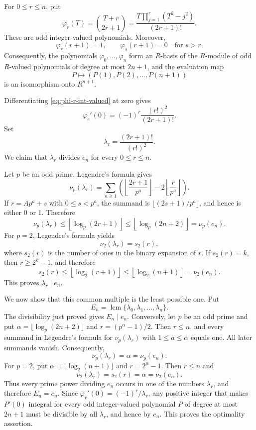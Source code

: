 \documentclass[14pt,dvipsnames]{extarticle}
\makeatletter
\numberwithin{equation}{subsection}
\theoremstyle{plain}
\theoremstyle{definition}
\theoremstyle{definition}
\renewenvironment{proof}[1][\proofname]{
 \par\pushQED{\qed}\normalfont
 \topsep6\p@\@plus6\p@\relax
 \trivlist\item[\hskip\labelsep\bfseries\itshape #1\@addpunct{.}]
}{\popQED\endtrivlist\@endpefalse}
\let\phi\varphi
\DeclareMathOperator{\lcm}{lcm}
\makeatother
\begin{document}
\begin{proof}
For $0\leq r\leq n$, put
\begin{equation}\label{eq:phi-r-int-valued}
 \phi_r(T)
 =\binom{T+r}{2r+1}
 =\frac{T\prod_{j=1}^{r}(T^2-j^2)}{(2r+1)!}.
\end{equation}
These are odd integer-valued polynomials. Moreover,
\[
 \phi_r(r+1)=1,
 \qquad
 \phi_s(r+1)=0\quad\text{for }s>r.
\]
Consequently, the polynomials $\phi_0,\ldots,\phi_n$ form an $R$-basis of the
$R$-module of odd $R$-valued polynomials of degree at most $2n+1$, and the
evaluation map
\[
 P\longmapsto(P(1),P(2),\ldots,P(n+1))
\]
is an isomorphism onto $R^{n+1}$.

Differentiating \eqref{eq:phi-r-int-valued} at zero gives
\begin{equation}\label{eq:phi-r-derivative}
 \phi_r'(0)
 =(-1)^r\frac{(r!)^2}{(2r+1)!}.
\end{equation}
Set
\[
 \lambda_r=\frac{(2r+1)!}{(r!)^2}.
\]
We claim that $\lambda_r$ divides $e_n$ for every $0\leq r\leq n$.

Let $p$ be an odd prime. Legendre's formula gives
\[
 \nu_p(\lambda_r)
 =\sum_{a\geq1}
 \left(
  \left\lfloor\frac{2r+1}{p^a}\right\rfloor
  -2\left\lfloor\frac r{p^a}\right\rfloor
 \right).
\]
If $r=Ap^a+s$ with $0\leq s<p^a$, the summand is
$\lfloor(2s+1)/p^a\rfloor$, and hence is either $0$ or $1$. Therefore
\[
 \nu_p(\lambda_r)
 \leq\left\lfloor\log_p(2r+1)\right\rfloor
 \leq\left\lfloor\log_p(2n+2)\right\rfloor
 =\nu_p(e_n).
\]
For $p=2$, Legendre's formula yields
\[
 \nu_2(\lambda_r)=s_2(r),
\]
where $s_2(r)$ is the number of ones in the binary expansion of $r$. If
$s_2(r)=k$, then $r\geq2^k-1$, and therefore
\[
 s_2(r)
 \leq\left\lfloor\log_2(r+1)\right\rfloor
 \leq\left\lfloor\log_2(n+1)\right\rfloor
 =\nu_2(e_n).
\]
This proves $\lambda_r\mid e_n$.

We now show that this common multiple is the least possible one. Put
\[
 E_n=\lcm\{\lambda_0,\lambda_1,\ldots,\lambda_n\}.
\]
The divisibility just proved gives $E_n\mid e_n$. Conversely, let $p$ be an
odd prime and put $\alpha=\lfloor\log_p(2n+2)\rfloor$ and
$r=(p^\alpha-1)/2$. Then $r\leq n$, and every summand in Legendre's formula
for $\nu_p(\lambda_r)$ with $1\leq a\leq\alpha$ equals one. All later
summands vanish. Consequently,
\[
 \nu_p(\lambda_r)=\alpha=\nu_p(e_n).
\]
For $p=2$, put $\alpha=\lfloor\log_2(n+1)\rfloor$ and $r=2^\alpha-1$.
Then $r\leq n$ and
\[
 \nu_2(\lambda_r)=s_2(r)=\alpha=\nu_2(e_n).
\]
Thus every prime power dividing $e_n$ occurs in one of the numbers
$\lambda_r$, and therefore $E_n=e_n$. Since
$\phi_r'(0)=(-1)^r/\lambda_r$, any positive integer that makes $P'(0)$
integral for every odd integer-valued polynomial $P$ of degree at most
$2n+1$ must be divisible by all $\lambda_r$, and hence by $e_n$. This proves
the optimality assertion.


\end{proof}
\end{document}
